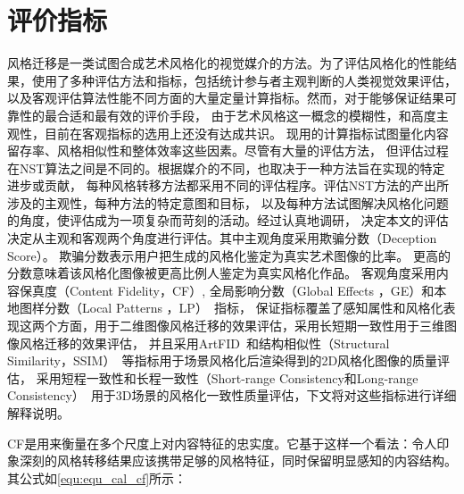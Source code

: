 \section{评价指标}
风格迁移是一类试图合成艺术风格化的视觉媒介的方法。为了评估风格化的性能结果，使用了多种评估方法和指标，包括统计参与者主观判断的人类视觉效果评估，
以及客观评估算法性能不同方面的大量定量计算指标。然而，对于能够保证结果可靠性的最合适和最有效的评价手段，
由于艺术风格这一概念的模糊性，和高度主观性，目前在客观指标的选用上还没有达成共识。
现用的计算指标试图量化内容留存率、风格相似性和整体效率这些因素。尽管有大量的评估方法，
但评估过程在NST算法之间是不同的。根据媒介的不同，也取决于一种方法旨在实现的特定进步或贡献，
每种风格转移方法都采用不同的评估程序。评估NST方法的产出所涉及的主观性，每种方法的特定意图和目标，
以及每种方法试图解决风格化问题的角度，使评估成为一项复杂而苛刻的活动。经过认真地调研，
决定本文的评估决定从主观和客观两个角度进行评估。其中主观角度采用欺骗分数（Deception Score）。
欺骗分数表示用户把生成的风格化鉴定为真实艺术图像的比率。
更高的分数意味着该风格化图像被更高比例人鉴定为真实风格化作品。
客观角度采用内容保真度（Content Fidelity，CF）, 全局影响分数（Global Effects ，GE）和本地图样分数（Local Patterns ，LP）~\cite{wang2021evaluate}指标，
保证指标覆盖了感知属性和风格化表现这两个方面，用于二维图像风格迁移的效果评估，采用长短期一致性用于三维图像风格迁移的效果评估，
并且采用ArtFID~\cite{wright2022artfid}和结构相似性（Structural Similarity，SSIM）~\cite{wang2004image}等指标用于场景风格化后渲染得到的2D风格化图像的质量评估，
采用短程一致性和长程一致性（Short-range Consistency和Long-range Consistency）~\cite{lai2018learning}用于3D场景的风格化一致性质量评估，下文将对这些指标进行详细解释说明。
\par CF是用来衡量在多个尺度上对内容特征的忠实度。它基于这样一个看法：令人印象深刻的风格转移结果应该携带足够的风格特征，同时保留明显感知的内容结构。其公式如\autoref{equ:equ_cal_cf}所示：

